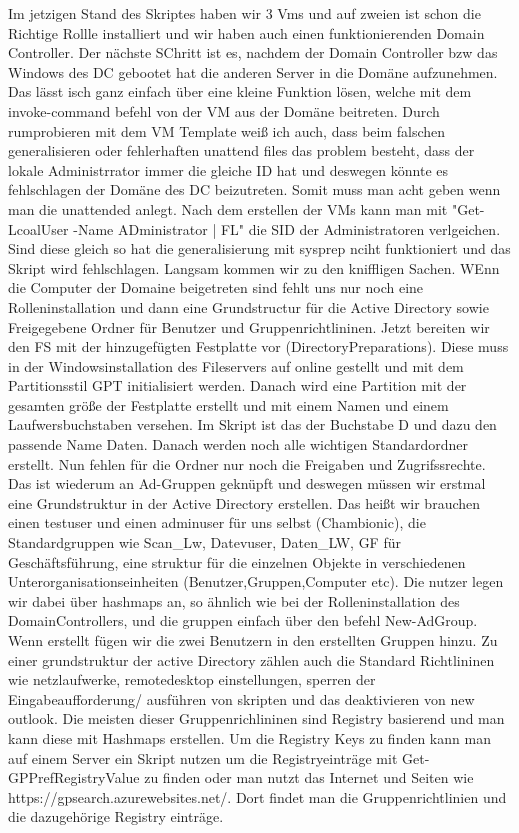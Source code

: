\documentclass[conference]{IEEEtran}
\begin{document}
Im jetzigen Stand des Skriptes haben wir 3 Vms und auf zweien ist schon die Richtige Rollle installiert und wir haben auch einen funktionierenden Domain Controller. Der nächste SChritt ist es, nachdem der Domain Controller bzw das Windows des DC gebootet hat die anderen Server in die Domäne aufzunehmen. Das lässt isch ganz einfach über eine kleine Funktion lösen, welche mit dem invoke-command befehl von der VM aus der Domäne beitreten. Durch rumprobieren mit dem VM Template weiß ich auch, dass beim falschen generalisieren oder fehlerhaften unattend files das problem besteht, dass der lokale Administrrator immer die gleiche ID hat und deswegen könnte es fehlschlagen der Domäne des DC beizutreten. Somit muss man acht geben wenn man die unattended anlegt. Nach dem erstellen der VMs kann man mit "Get-LcoalUser -Name ADministrator | FL" die SID der Administratoren verlgeichen. Sind diese gleich so hat die generalisierung mit sysprep nciht funktioniert und das Skript wird fehlschlagen. Langsam kommen wir zu den kniffligen Sachen. WEnn die Computer der Domaine beigetreten sind fehlt uns nur noch eine Rolleninstallation und dann eine Grundstructur für die Active Directory sowie Freigegebene Ordner für Benutzer und Gruppenrichtlininen. 
Jetzt bereiten wir den FS mit der hinzugefügten Festplatte vor (DirectoryPreparations). Diese muss in der Windowsinstallation des Fileservers auf online gestellt und mit dem Partitionsstil GPT initialisiert werden. Danach wird eine Partition mit der gesamten größe der Festplatte erstellt und mit einem Namen und einem Laufwersbuchstaben versehen. Im Skript ist das der Buchstabe D und dazu den passende Name Daten. Danach werden noch alle wichtigen Standardordner erstellt.
Nun fehlen für die Ordner nur noch die Freigaben und Zugrifssrechte. Das ist wiederum an Ad-Gruppen geknüpft und deswegen müssen wir erstmal eine Grundstruktur in der Active Directory erstellen. Das heißt wir brauchen einen testuser und einen adminuser für uns selbst (Chambionic), die Standardgruppen wie Scan_Lw, Datevuser, Daten_LW, GF für Geschäftsführung, eine struktur für die einzelnen Objekte in verschiedenen Unterorganisationseinheiten (Benutzer,Gruppen,Computer etc). Die nutzer legen wir dabei über hashmaps an, so ähnlich wie bei der Rolleninstallation des DomainControllers, und die gruppen einfach über den befehl New-AdGroup. 
Wenn erstellt fügen wir die zwei Benutzern in den erstellten Gruppen hinzu. Zu einer grundstruktur der active Directory zählen auch die Standard Richtlininen wie netzlaufwerke, remotedesktop einstellungen, sperren der Eingabeaufforderung/ ausführen von skripten und das deaktivieren von new outlook. Die meisten dieser Gruppenrichlininen sind Registry basierend und man kann diese mit Hashmaps erstellen. Um die Registry Keys zu finden kann man auf einem Server ein Skript nutzen um die Registryeinträge mit Get-GPPrefRegistryValue zu finden oder man nutzt das Internet und Seiten wie https://gpsearch.azurewebsites.net/. Dort findet man die Gruppenrichtlinien und die dazugehörige Registry einträge. 
\end{document}
